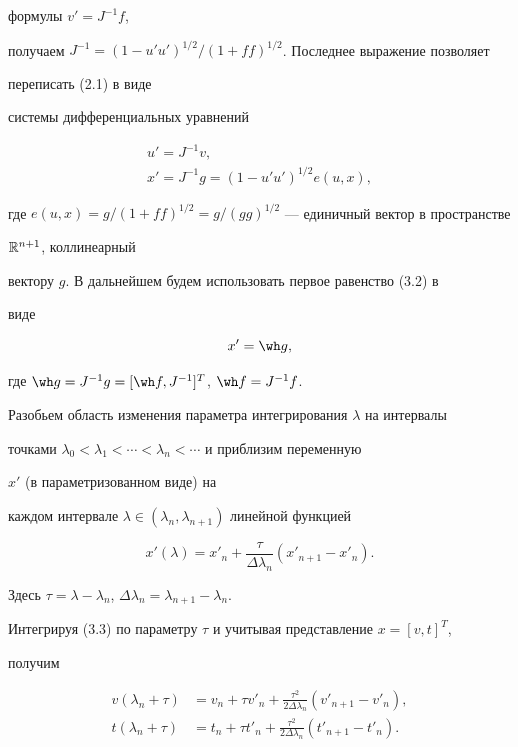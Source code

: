формулы $v'=J^{-1}f$, 


получаем $J^{-1}=(1-u'u')^{1/2}/(1+ff)^{1/2}$. Последнее выражение позволяет 


переписать (2.1) в виде 


системы дифференциальных уравнений 


\begin{gather} 


u'=J^{-1}v,\\ 


x'=J^{-1}g=(1-u'u')^{1/2}e(u,x), 


\end{gather} 


где $e(u,x)=g/(1+ff)^{1/2}=g/(gg)^{1/2}$ --- единичный вектор в пространстве 


$\Bbb R^{n+1}$, коллинеарный 


вектору $g$. В дальнейшем будем использовать первое равенство (3.2) в 


виде 


$$ 


x'=\wh g, 


$$ 


где $\wh g=J^{-1}g=[\wh f,J^{-1}]^T$, $\wh f=J^{-1}f$. 


 


Разобьем область изменения параметра интегрирования $\lambda$ на интервалы 


точками $\lambda_0<\lambda_1<\dotsb<\lambda_n<\dotsb$ и приблизим переменную 


$x'$ (в параметризованном виде) на 


каждом интервале $\lambda\in(\lambda_n,\lambda_{n+1})$ линейной функцией 


\begin{equation} 


x'(\lambda)=x'_n+\frac{\tau}{\Delta\lambda_n}(x'_{n+1}-x'_n). 


\end{equation} 


Здесь $\tau=\lambda-\lambda_n$, $\Delta\lambda_n=\lambda_{n+1}-\lambda_n$. 


 


Интегрируя (3.3) по параметру $\tau$ и учитывая представление $x=[v,t]^T$, 


получим 


\begin{align} 


v(\lambda_n+\tau)&=v_n+\tau v'_n+ 


\frac{\tau^2}{2\Delta\lambda_n}(v'_{n+1}-v'_n),\\ 


t(\lambda_n+\tau)&=t_n+\tau t'_n+ 


\frac{\tau^2}{2\Delta\lambda_n}(t'_{n+1}-t'_n). 


\end{align} 


